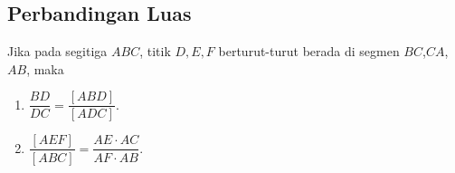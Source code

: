 \subsection{Perbandingan Luas}
Jika pada segitiga $ABC$, titik $D,E,F$ berturut-turut berada di segmen $BC$,$CA$,$AB$, maka 
\begin{enumerate}
    \item $\dfrac{BD}{DC} = \dfrac{[ABD]}{[ADC]}.$
    \item $\dfrac{[AEF]}{[ABC]}=\dfrac{AE \cdot AC}{AF \cdot AB}.$
\end{enumerate}